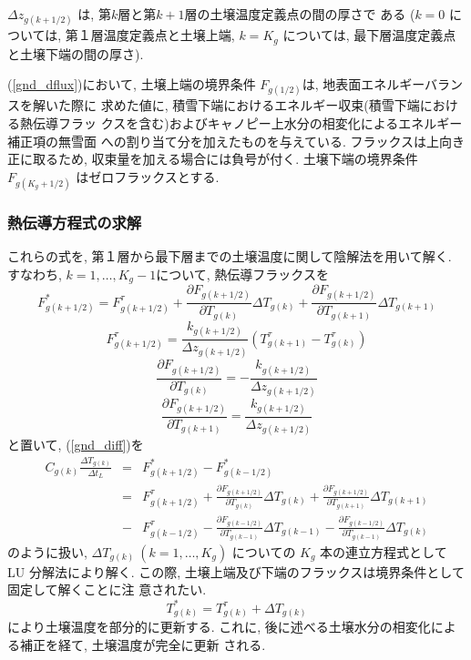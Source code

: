 $\Delta z_{g(k+1/2)}$ は, 第$k$層と第$k+1$層の土壌温度定義点の間の厚さで
ある ($k=0$ については, 第１層温度定義点と土壌上端, $k=K_g$ については,
最下層温度定義点と土壌下端の間の厚さ). 

(\ref{gnd_dflux})において, 
土壌上端の境界条件 $F_{g(1/2)}$は, 地表面エネルギーバランスを解いた際に
求めた値に, 積雪下端におけるエネルギー収束(積雪下端における熱伝導フラッ
クスを含む)およびキャノピー上水分の相変化によるエネルギー補正項の無雪面
への割り当て分を加えたものを与えている. フラックスは上向き正に取るため,
収束量を加える場合には負号が付く. 
土壌下端の境界条件 $F_{g(K_g+1/2)}$ はゼロフラックスとする. 

\subsubsection{熱伝導方程式の求解}

これらの式を, 第１層から最下層までの土壌温度に関して陰解法を用いて解く. 
すなわち, $k=1,\ldots,K_g-1$について, 熱伝導フラックスを
\begin{equation}
  F_{g(k+1/2)}^{*} = F_{g(k+1/2)}^{\tau}
+\frac{\partial {F}_{g(k+1/2)}}{\partial T_{g(k)}} 
 \Delta T_{g(k)}
+\frac{\partial {F}_{g(k+1/2)}}{\partial T_{g(k+1)}} 
 \Delta T_{g(k+1)}
\end{equation}
\begin{equation}
  F_{g(k+1/2)}^{\tau} =
\frac{k_{g(k+1/2)}}{\Delta z_{g(k+1/2)}}(T_{g(k+1)}^{\tau} - T_{g(k)}^{\tau})
\end{equation}
\begin{equation}
 \frac{\partial {F}_{g(k+1/2)}}{\partial T_{g(k)}} = 
- \frac{k_{g(k+1/2)}}{\Delta z_{g(k+1/2)}}
\end{equation}
\begin{equation}
 \frac{\partial {F}_{g(k+1/2)}}{\partial T_{g(k+1)}} = 
\frac{k_{g(k+1/2)}}{\Delta z_{g(k+1/2)}}
\end{equation}
と置いて, (\ref{gnd_diff})を
\begin{eqnarray}
C_{g(k)} \frac{\Delta T_{g(k)}}{\Delta t_L} 
&=& F_{g(k+1/2)}^* - {F}_{g(k-1/2)}^* \nonumber \\
&=& {F}_{g(k+1/2)}^{\tau} 
+\frac{\partial F_{g(k+1/2)}}{\partial T_{g(k)}} 
 \Delta T_{g(k)}
+\frac{\partial F_{g(k+1/2)}}{\partial T_{g(k+1)}} 
 \Delta T_{g(k+1)} \nonumber \\
&-& F_{g(k-1/2)}^{\tau}
-\frac{\partial F_{g(k-1/2)}}{\partial T_{g(k-1)}} 
 \Delta T_{g(k-1)}
-\frac{\partial F_{g(k-1/2)}}{\partial T_{g(k-1)}} 
 \Delta T_{g(k)}
\end{eqnarray}
のように扱い, $\Delta T_{g(k)}\ (k=1,\ldots,K_{g})$ についての
$K_{g}$ 本の連立方程式として LU 分解法により解く. 
この際, 土壌上端及び下端のフラックスは境界条件として固定して解くことに注
意されたい. 
\begin{equation}
 T_{g(k)}^* = T_{g(k)}^{\tau} + \Delta T_{g(k)}
\end{equation}
により土壌温度を部分的に更新する. 
これに, 後に述べる土壌水分の相変化による補正を経て, 土壌温度が完全に更新
される. 

